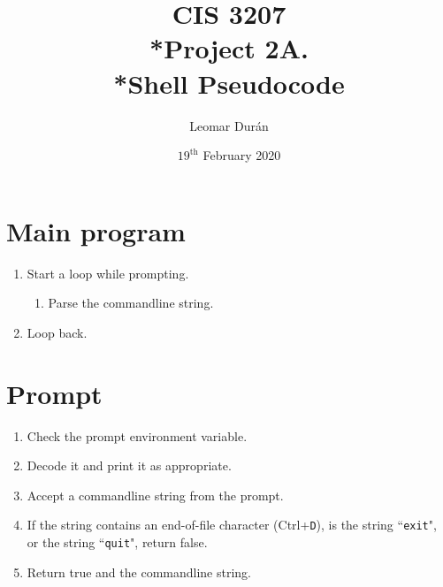 \documentclass{article}
\title{CIS 3207\\*Project 2A.\\*Shell Pseudocode}
\author{Leomar Dur\'an}
\date{\(19^{\text{th}}\) February 2020}
\begin{document}
\maketitle

\section{Main program}

\begin{enumerate}
    \item
        Start a loop while prompting.
        \begin{enumerate}
            \item
                Parse the commandline string.
        \end{enumerate}
    \item
        Loop back.
\end{enumerate}

\section{Prompt}
\begin{enumerate}
    \item
        Check the prompt environment variable.
    \item
        Decode it and print it as appropriate.
    \item
        Accept a commandline string from the prompt.
    \item
        If the string contains an end-of-file character (Ctrl+\texttt{D}), is the string ``\texttt{exit}", or the string ``\texttt{quit}", return false.
    \item
        Return true and the commandline string.
\end{enumerate}
\end{document}
